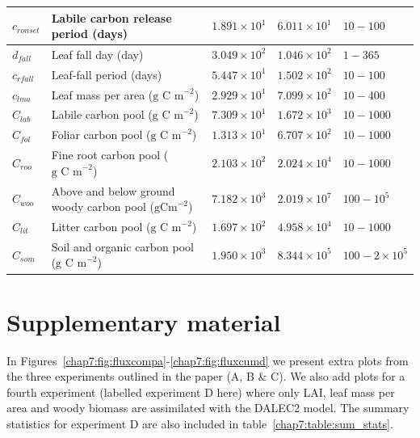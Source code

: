 \begin{table}[ht]
\begin{center}
\begin{tabular}{| l | p{4.5cm} | p{1.7cm} | p{1.7cm} | p{1.7cm} |}
$c_{ronset}$ & Labile carbon release period (days) & $1.891\times 10^{1}$ & $6.011\times 10^{1}$ & $10 - 100$ \\ \hline
$d_{fall}$ & Leaf fall day (day) & $3.049\times 10^{2}$ & $1.046\times 10^{2}$ & $1 - 365$ \\ \hline
$c_{rfall}$ & Leaf-fall period (days) & $5.447\times 10^{1}$ & $1.502\times 10^{2}$ & $10 - 100$ \\ \hline
$c_{lma}$ & Leaf mass per area ($\text{g C m}^{-2}$) & $2.929\times 10^{1}$ & $7.099\times 10^{2}$ & $10 - 400$ \\ \hline
$C_{lab}$ & Labile carbon pool ($\text{g C m}^{-2}$) & $7.309\times 10^{1}$ & $1.672\times 10^{3}$ & $10 - 1000$ \\ \hline
$C_{fol}$ & Foliar carbon pool ($\text{g C m}^{-2}$) & $1.313\times 10^{1}$ & $6.707\times 10^{2}$ & $10 - 1000$ \\ \hline
$C_{roo}$ & Fine root carbon pool ($\text{g C m}^{-2}$) & $2.103\times 10^{2}$ & $2.024\times 10^{4}$ & $10 - 1000$ \\ \hline
$C_{woo}$ & Above and below ground woody carbon pool ($\text{gCm}^{-2}$) & $7.182\times 10^{3}$ & $2.019\times 10^{7}$ & $100 - 10^{5}$ \\ \hline
$C_{lit}$ & Litter carbon pool ($\text{g C m}^{-2}$) & $1.697\times 10^{2}$ & $4.958\times 10^{4}$ & $10 - 1000$ \\ \hline
$C_{som}$ & Soil and organic carbon pool ($\text{g C m}^{-2}$) & $1.950\times 10^{3}$ & $8.344\times 10^{5}$ & $100 - 2 \times 10^{5}$  \\ \hline
	\end{tabular}
	\label{chap7:table:xbvars}
\end{center} 
\end{table}


\section{Supplementary material}


In Figures~\ref{chap7:fig:fluxcompa}-\ref{chap7:fig:fluxcumd} we present extra plots from the three experiments outlined in the paper (A, B \& C). We also add plots for a fourth experiment (labelled experiment D here) where only LAI, leaf mass per area and woody biomass are assimilated with the DALEC2 model. The summary statistics for experiment D are also included in table~\ref{chap7:table:sum_stats}.

